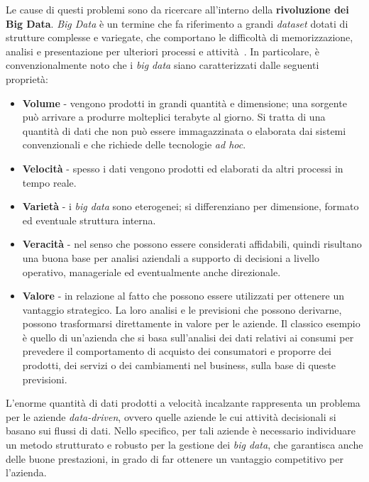 Le cause di questi problemi sono da ricercare all'interno della \textbf{rivoluzione dei Big Data}.
\textit{Big Data} è un termine che fa riferimento a grandi \textit{dataset} dotati di strutture complesse e variegate, che comportano le difficoltà di memorizzazione, analisi e presentazione per ulteriori processi e attività~\cite{big-data-review}.
In particolare, è convenzionalmente noto che i \textit{big data} siano caratterizzati dalle seguenti proprietà:
\begin{itemize}
    \item \textbf{Volume} - vengono prodotti in grandi quantità e dimensione;
    una sorgente può arrivare a produrre molteplici terabyte al giorno.
    Si tratta di una quantità di dati che non può essere immagazzinata o elaborata dai sistemi convenzionali e che richiede delle tecnologie \textit{ad hoc}.
    \item \textbf{Velocità} - spesso i dati vengono prodotti ed elaborati da altri processi in tempo reale.
    \item \textbf{Varietà} - i \textit{big data} sono eterogenei;
    si differenziano per dimensione, formato ed eventuale struttura interna.
    \item \textbf{Veracità} - nel senso che possono essere considerati affidabili, quindi risultano una buona base per analisi aziendali a supporto di decisioni a livello operativo, manageriale ed eventualmente anche direzionale.
    \item \textbf{Valore} - in relazione al fatto che possono essere utilizzati per ottenere un vantaggio strategico.
    La loro analisi e le previsioni che possono derivarne, possono trasformarsi direttamente in valore per le aziende.
    Il classico esempio è quello di un'azienda che si basa sull'analisi dei dati relativi ai consumi per prevedere il comportamento di acquisto dei consumatori e proporre dei prodotti, dei servizi o dei cambiamenti nel business, sulla base di queste previsioni.
\end{itemize}
L'enorme quantità di dati prodotti a velocità incalzante rappresenta un problema per le aziende \textit{data-driven}, ovvero quelle aziende le cui attività decisionali si basano sui flussi di dati.
Nello specifico, per tali aziende è necessario individuare un metodo strutturato e robusto per la gestione dei \textit{big data}, che garantisca anche delle buone prestazioni, in grado di far ottenere un vantaggio competitivo per l'azienda.

